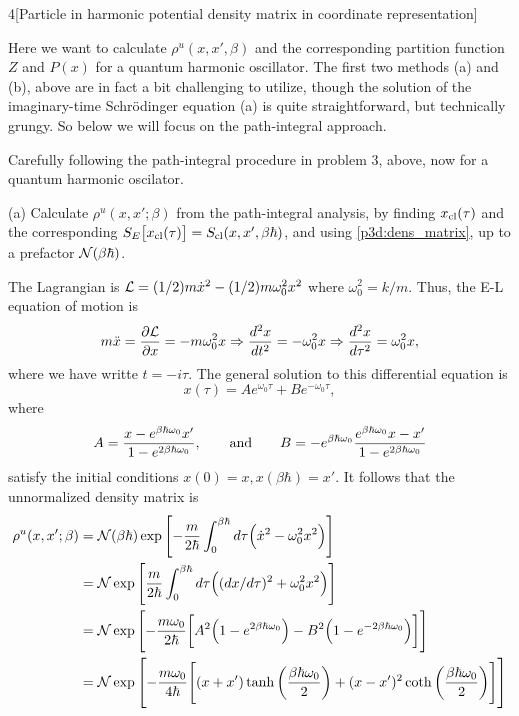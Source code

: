\documentclass[12pt]{article}
\begin{document}
\begin{problem}{4}[Particle in harmonic potential density matrix in coordinate
    representation]

Here we want to calculate $\rho^u(x,x',\beta)$ and the corresponding partition
function $Z$ and $P(x)$ for a quantum harmonic oscillator. The first two methods
(a) and (b), above are in fact a bit challenging to utilize, though the solution
of the imaginary-time Schr\"{o}dinger equation (a) is quite straightforward, but
technically grungy. So below we will focus on the path-integral approach.

Carefully following the path-integral procedure in problem 3, above, now for a
quantum harmonic oscilator.

(a) Calculate $\rho^u(x,x';\beta)$ from the path-integral analysis, by finding
$x_{\text{cl}}(\tau)$ and the corresponding
$S_E\qty[x_{\text{cl}}(\tau)]=S_{\text{cl}}(x,x',\beta\hbar)$, and using
\eqref{p3d:dens_matrix}, up to a prefactor $\mathcal{N}(\beta\hbar)$.
\begin{solution}
The Lagrangian is $\mathcal{L}=(1/2)m\dot{x}^2-(1/2)m\omega_0^2x^2$ where
$\omega_0^2=k/m$. Thus, the E-L equation of motion is
\begin{equation}
    m\ddot{x}=\frac{\partial\mathcal{L}}{\partial x}
    =-m\omega_0^2x\Rightarrow\frac{d^2x}{dt^2}=-\omega_0^2x
    \Rightarrow\frac{d^2x}{d\tau^2}=\omega_0^2x,
\end{equation}
where we have writte $t=-i\tau$. The general solution to this differential
equation is
\begin{equation}
    x(\tau)=Ae^{\omega_0\tau}+Be^{-\omega_0\tau}, 
\end{equation}
where
\begin{equation}
    A=\frac{x-e^{\beta\hbar\omega_0}x'}{1-e^{2\beta\hbar\omega_0}},\qquad\text{and}
    \qquad
    B=-e^{\beta\hbar\omega_0}\frac{e^{\beta\hbar\omega_0}x-x'}{1-e^{2\beta\hbar\omega_0}}
\end{equation}
satisfy the initial conditions $x(0)=x,x(\beta\hbar)=x'$. It follows that the
unnormalized density matrix is
\begin{align}
    \rho^u(x,x';\beta)
    &=\mathcal{N}(\beta\hbar)\exp\qty[-\frac{m}{2\hbar}\int_0^{\beta\hbar}d\tau\qty(\dot{x}^2-\omega_0^2x^2)]\notag\\
    &=\mathcal{N}\exp\qty[\frac{m}{2\hbar}\int_0^{\beta\hbar}d\tau
    \qty((dx/d\tau)^2+\omega_0^2x^2)]\notag\\
    &=\mathcal{N}\exp\qty[-\frac{m\omega_0}{2\hbar}
        \qty[A^2\qty(1-e^{2\beta\hbar\omega_0})-B^2\qty(1-e^{-2\beta\hbar\omega_0})]]\notag\\
    &=\mathcal{N}\exp\qty[-\frac{m\omega_0}{4\hbar}\qty[(x+x')\tanh\qty(\frac{\beta\hbar\omega_0}{2})+(x-x')^2\coth\qty(\frac{\beta\hbar\omega_0}{2})]]
\end{align}
\end{solution}


\end{problem}
\end{document}

